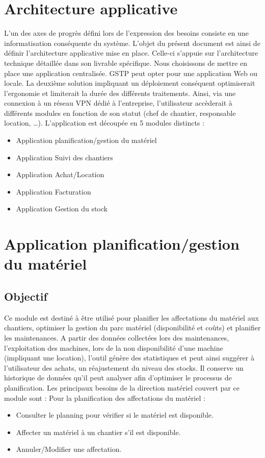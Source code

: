 \section{Architecture applicative}
        L’un des axes de progrès défini lors de l’expression des besoins consiste en une informatisation conséquente du système. L’objet du présent document est ainsi de définir l’architecture applicative mise en place. Celle-ci s’appuie sur l’architecture technique détaillée dans son livrable spécifique.
Nous choisissons de mettre en place une application centralisée. GSTP peut opter pour une application Web ou locale. La deuxième solution impliquant un déploiement conséquent optimiserait l’ergonomie et limiterait la durée des différents traitements. Ainsi, via une connexion à un réseau VPN dédié à l’entreprise, l’utilisateur accèderait à différents modules en fonction de son statut (chef de chantier, responsable location, …).
L’application est découpée en 5 modules distincts :
\begin{itemize}
	\item Application planification/gestion du matériel
	\item Application Suivi des chantiers
	\item Application Achat/Location
	\item Application Facturation
	\item Application Gestion du stock
\end{itemize}

\section{Application planification/gestion du matériel}
	\subsection{Objectif}
	Ce module est destiné à être utilisé pour planifier les affectations du matériel aux chantiers, optimiser la gestion du parc matériel (disponibilité et coûts) et planifier les maintenances.
	A partir des données collectées lors des maintenances, l'exploitation des machines, lors de la non disponibilité d'une machine (impliquant une location), l'outil génère des statistiques et peut ainsi suggérer à l'utilisateur des achats, un réajustement du niveau des stocks.
	Il conserve un historique de données qu'il peut analyser afin d'optimiser le processus de planification. Les principaux besoins de la direction matériel couvert par ce module sont :
        Pour la planification des affectations du matériel :
               \begin{itemize}
	               \item Consulter le planning pour vérifier si le matériel est disponible.
	               \item Affecter un matériel à un chantier s'il est disponible.
	               \item Annuler/Modifier une affectation.
               \end{itemize}

